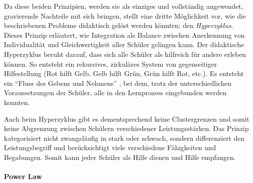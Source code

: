 {Da diese beiden Prinzipien, werden sie als einziges und vollständig angewendet, gravierende Nachteile mit sich bringen, stellt \citeauthor{Zimpel2012} eine dritte Möglichkeit vor, wie die beschriebenen Probleme didaktisch gelöst werden könnten: den \emph{Hyperzyklus}.
Dieses Prinzip erläutert, wie Integration als Balance zwischen Anerkennung von Individualität und Gleichwertigkeit aller Schüler gelingen kann.
Der didaktische Hyperzyklus beruht darauf, dass sich alle Schüler als hilfreich für andere erleben können.
So entsteht ein rekursives, zirkuläres System von gegenseitiger Hilfestellung (Rot hilft Gelb, Gelb hilft Grün, Grün hilft Rot, etc.).
Es entsteht ein ``Fluss des Gebens und Nehmens'' \parencite[125]{Zimpel2012}, bei dem, trotz der unterschiedlichen Voraussetzungen der Schüler, alle in den Lernprozess eingebunden werden konnten.

Auch beim Hyperzyklus gibt es dementsprechend keine Clustergrenzen und somit keine Abgrenzung zwischen Schülern verschiedener Leistungsstärken.
Das Prinzip kategorisiert nicht zwangsläufig in stark oder schwach, sondern differenziert den Leistungsbegriff und berücksichtigt viele verschiedene Fähigkeiten und Begabungen.
Somit kann jeder Schüler als Hilfe dienen und Hilfe empfangen.

\paragraph{Power Law}

}
